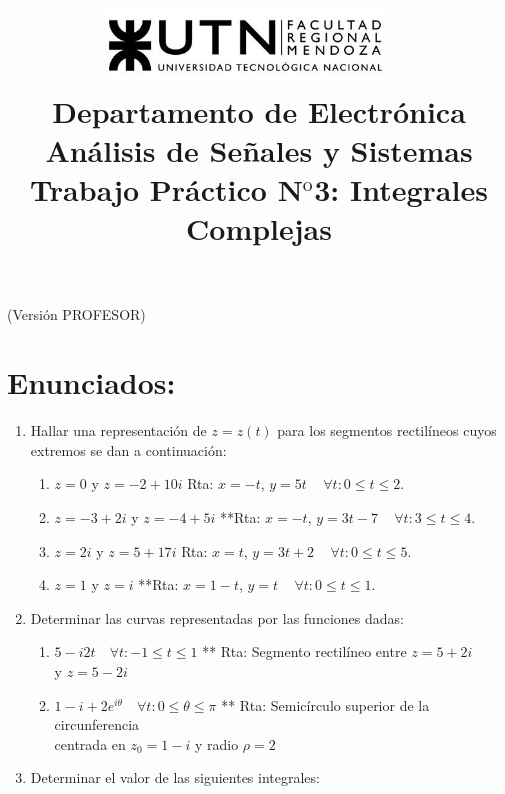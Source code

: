 \documentclass[10pt,a4paper]{article}
\title{
	\textsc{\includegraphics[width=0.55\textwidth]{logoUTN.jpg}} ~\\
	{\large Departamento de Electr\'onica}\\ 
	[0.1cm]
	{\Huge{An\'alisis de Se\~nales y Sistemas}} \\
	[0.25cm]
	{\Large{Trabajo Pr\'{a}ctico N$^{\text {o}}$3: Integrales Complejas}		\\
	}}
\author{}
\date{}
\begin{document}
\maketitle
\begin{profesor}
	\hspace{6cm}(Versión PROFESOR)
\end{profesor}
\thispagestyle{fancy}

\section*{Enunciados:}
\label{sec:enun}
\begin{enumerate}
\item {Hallar una representaci\'on de $z=z(t)$ para los segmentos rectilíneos cuyos extremos se dan a continuaci\'on:}
\begin{enumerate}
	\item $z=0$ y $z=-2+10i$ \tab Rta: $x=-t$, $y=5t$ ~ $\forall t:0\leq t\leq 2.$ %
	\item $z=-3+2i$	y $z=-4+5i$	**\tab Rta: $x=-t$, $y=3t-7$ ~ $\forall t:3\leq t\leq 4.$	%
	\item $z=2i$ y $z=5+17i$ \tab Rta: $x=t$, $y=3t+2$ ~ $\forall t:0\leq t \leq 5.$ %
	\item $z=1$ y $z=i$ **\tab Rta: $x=1-t$, $y=t$ ~ $\forall t:0\leq t \leq 1.$ %
\end{enumerate}


\item {Determinar las curvas representadas por las funciones dadas:}
\begin{enumerate}
	\item %
	$5-i2t \quad \forall t:  -1 \leq t \leq 1$ ** \tab Rta: Segmento rectil\'ineo 
	entre $z=5+2i$ \\ \phantom{.} \tab y $z=5-2i$	
	\item %
	$1-i+2e^{i\theta} \quad \forall t: 0 \leq \theta \leq \pi $ **		 \tab 
	Rta: Semic\'irculo superior de la circunferencia \\ 
	\phantom{.} \tab centrada en $z_0=1-i$ y radio $\rho =2$
\end{enumerate}

\item {Determinar el valor de las siguientes integrales:}	
		

\end{enumerate}
\end{document}
